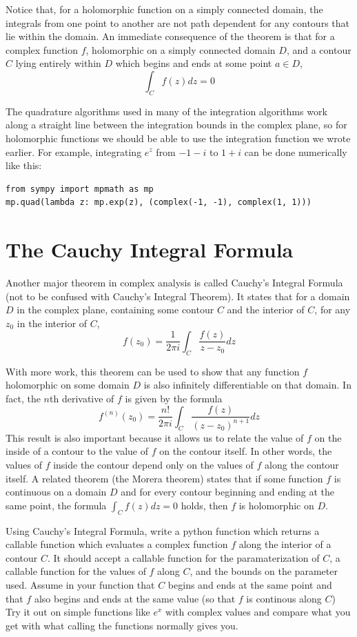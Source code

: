 Notice that, for a holomorphic function on a simply connected domain, the integrals from one point to another are not path dependent for any contours that lie within the domain.
An immediate consequence of the theorem is that for a complex function $f$, holomorphic on a simply connected domain $D$, and a contour $C$ lying entirely within $D$ which begins and ends at some point $a\in D$,
\[\int_C f(z)dz=0\]

The quadrature algorithms used in many of the integration algorithms work along a straight line between the integration bounds in the complex plane, so for holomorphic functions we should be able to use the integration function we wrote earlier.
For example, integrating $e^z$ from $-1-i$ to $1+i$ can be done numerically like this:
\begin{lstlisting}
from sympy import mpmath as mp
mp.quad(lambda z: mp.exp(z), (complex(-1, -1), complex(1, 1)))
\end{lstlisting}

\section*{The Cauchy Integral Formula}

Another major theorem in complex analysis is called Cauchy's Integral Formula (not to be confused with Cauchy's Integral Theorem).
It states that for a domain $D$ in the complex plane, containing some contour $C$ and the interior of $C$, for any $z_0$ in the interior of $C$,
\[f(z_0)=\frac{1}{2\pi i} \int_C \frac{f(z)}{z-z_0} dz\]

With more work, this theorem can be used to show that any function $f$ holomorphic on some domain $D$ is also infinitely differentiable on that domain.
In fact, the $n$th derivative of $f$ is given by the formula
\[f^{(n)}(z_0) = \frac{n!}{2\pi i} \int_C \frac{f(z)}{(z-z_0)^{n+1}} dz\]
This result is also important because it allows us to relate the value of $f$ on the inside of a contour to the value of $f$ on the contour itself.
In other words, the values of $f$ inside the contour depend only on the values of $f$ along the contour itself.
A related theorem (the Morera theorem) states that if some function $f$ is continuous on a domain $D$ and for every contour beginning and ending at the same point, the formula $\int_C f(z) dz = 0$ holds, then $f$ is holomorphic on $D$.

\begin{problem}
Using Cauchy's Integral Formula, write a python function which returns a callable function which evaluates a complex function $f$ along the interior of a contour $C$.
It should accept a callable function for the paramaterization of $C$, a callable function for the values of $f$ along $C$, and the bounds on the parameter used.
Assume in your function that $C$ begins and ends at the same point and that $f$ also begins and ends at the same value (so that $f$ is continous along $C$)
Try it out on simple functions like $e^x$ with complex values and compare what you get with what calling the functions normally gives you.
\end{problem}

